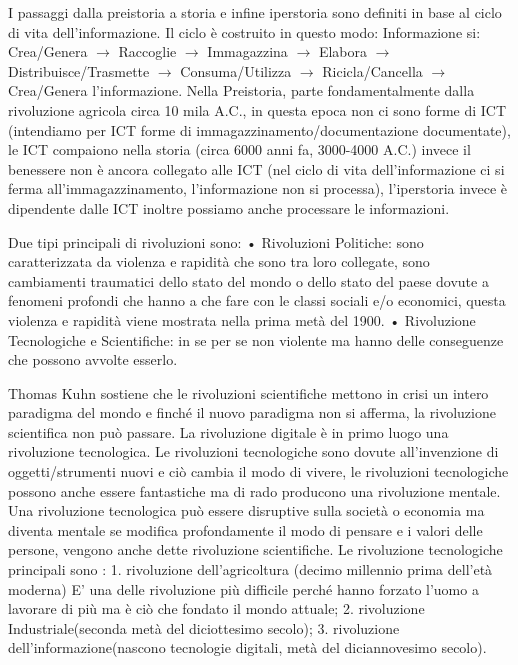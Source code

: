 \documentclass[11pt, a4page, twocolumn]{article}
\begin{document}
I passaggi dalla preistoria a storia e infine iperstoria sono definiti in base al ciclo di vita dell’informazione. Il ciclo è costruito in questo modo: Informazione si: Crea/Genera $\rightarrow$ Raccoglie $\rightarrow$ Immagazzina $\rightarrow$ Elabora $\rightarrow$ Distribuisce/Trasmette $\rightarrow$ Consuma/Utilizza $\rightarrow$ Ricicla/Cancella $\rightarrow$ Crea/Genera l’informazione.
Nella Preistoria, parte fondamentalmente dalla rivoluzione agricola circa 10 mila A.C., in questa epoca non ci sono forme di ICT (intendiamo per ICT forme di immagazzinamento/documentazione documentate), le ICT compaiono nella storia (circa 6000 anni fa, 3000-4000 A.C.) invece il benessere non è ancora collegato alle ICT (nel ciclo di vita dell’informazione ci si ferma all'immagazzinamento, l’informazione non si processa), l’iperstoria invece è dipendente dalle ICT inoltre possiamo anche processare le informazioni.


Due tipi principali di rivoluzioni sono:
    • Rivoluzioni Politiche: sono caratterizzata da violenza e rapidità che sono tra loro collegate, sono cambiamenti traumatici dello stato del mondo o dello stato del paese dovute a fenomeni profondi che hanno a che fare con le classi sociali e/o economici, questa violenza e rapidità viene mostrata nella prima metà del 1900.
    • Rivoluzione Tecnologiche e Scientifiche:  in se per se non violente ma hanno delle conseguenze che possono avvolte esserlo.

Thomas Kuhn sostiene che le rivoluzioni scientifiche mettono in crisi un intero paradigma del mondo e finché il nuovo paradigma non si afferma, la rivoluzione scientifica non può passare.
La rivoluzione digitale è in primo luogo una rivoluzione tecnologica. Le rivoluzioni tecnologiche sono dovute all’invenzione di oggetti/strumenti nuovi e ciò cambia il modo di vivere, le rivoluzioni tecnologiche possono anche essere fantastiche ma di rado producono una rivoluzione mentale. Una rivoluzione tecnologica può essere disruptive sulla società o economia ma diventa mentale se modifica profondamente il modo di pensare e i valori delle persone, vengono anche dette rivoluzione scientifiche.
Le rivoluzione tecnologiche principali sono : 
    1. rivoluzione dell’agricoltura (decimo millennio prima dell’età moderna) E’ una delle rivoluzione più difficile perché hanno forzato l’uomo a lavorare di più ma è ciò che fondato il mondo attuale;
    2. rivoluzione Industriale(seconda metà del diciottesimo secolo);
    3. rivoluzione dell’informazione(nascono tecnologie digitali, metà del diciannovesimo secolo).
\end{document}
